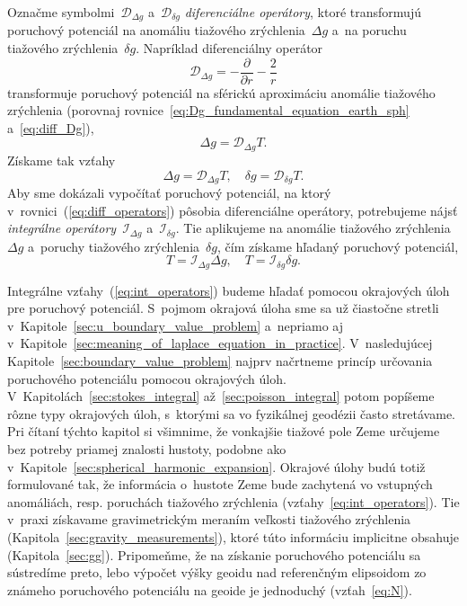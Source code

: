 \documentclass[a4paper, 12pt]{book}
\newcommand{\DIFF}{\mathcal D}
\newcommand{\INT}{\mathcal I}
\begin{document}
Označme symbolmi~$\DIFF_{\Delta g}$ a~$\DIFF_{\delta g}$ \emph{diferenciálne 
operátory}, ktoré transformujú poruchový potenciál na anomáliu tiažového 
zrýchlenia~$\Delta g$ a~na poruchu tiažového zrýchlenia~$\delta g$.  Napríklad 
diferenciálny operátor
%
\begin{equation}
\label{eq:diff_Dg}
\DIFF_{\Delta g} = -\frac{\partial}{\partial r} - \frac{2}{r}
\end{equation}
%
transformuje poruchový potenciál na sférickú aproximáciu anomálie tiažového 
zrýchlenia (porovnaj rovnice~\ref{eq:Dg_fundamental_equation_earth_sph} 
a~\ref{eq:diff_Dg}),
%
\begin{equation}
\Delta g = \DIFF_{\Delta g} T{.}
\end{equation}
%
Získame tak vzťahy
%
\begin{equation}
\label{eq:diff_operators}
\Delta g = \DIFF_{\Delta g}T{,} \quad \delta g = \DIFF_{\delta g}T{.}
\end{equation}
%
Aby sme dokázali vypočítať poruchový potenciál, na ktorý 
v~rovnici~(\ref{eq:diff_operators}) pôsobia diferenciálne operátory, 
potrebujeme nájsť \emph{integrálne operátory}~$\INT_{\Delta g}$ a~$\INT_{\delta 
g}$.  Tie aplikujeme na anomálie tiažového zrýchlenia~$\Delta g$ a~poruchy 
tiažového zrýchlenia~$\delta g$, čím získame hľadaný poruchový potenciál,
%
\begin{equation}
\label{eq:int_operators}
T = \INT_{\Delta g} \Delta g{,} \quad T = \INT_{\delta g}\delta g{.}
\end{equation}

Integrálne vzťahy~(\ref{eq:int_operators}) budeme hľadať pomocou okrajových 
úloh pre poruchový potenciál.  S~pojmom okrajová úloha sme sa už čiastočne 
stretli v~Kapitole~\ref{sec:u_boundary_value_problem} a~nepriamo aj 
v~Kapitole~\ref{sec:meaning_of_laplace_equation_in_practice}.  V~nasledujúcej 
Kapitole~\ref{sec:boundary_value_problem} najprv načrtneme princíp určovania 
poruchového potenciálu pomocou okrajových úloh.  
V~Kapitolách~\ref{sec:stokes_integral} až~\ref{sec:poisson_integral} potom 
popíšeme rôzne typy okrajových úloh, s~ktorými sa vo fyzikálnej geodézii často 
stretávame.  Pri čítaní týchto kapitol si všimnime, že vonkajšie tiažové pole 
Zeme určujeme bez potreby priamej znalosti hustoty, podobne ako 
v~Kapitole~\ref{sec:spherical_harmonic_expansion}.  Okrajové úlohy budú totiž 
formulované tak, že informácia o~hustote Zeme bude zachytená vo vstupných 
anomáliách, resp. poruchách tiažového zrýchlenia 
(vzťahy~\ref{eq:int_operators}).  Tie v~praxi získavame gravimetrickým meraním 
veľkosti tiažového zrýchlenia (Kapitola~\ref{sec:gravity_measurements}), ktoré 
túto informáciu implicitne obsahuje (Kapitola~\ref{sec:gg}).  Pripomeňme, že na 
získanie poruchového potenciálu sa sústredíme preto, lebo výpočet výšky geoidu 
nad referenčným elipsoidom zo známeho poruchového potenciálu na geoide je 
jednoduchý (vzťah~\ref{eq:N}).
\end{document}
